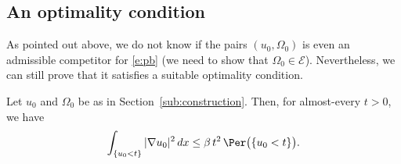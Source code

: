 \subsection{An optimality condition}
As pointed out above, we do not know if the pairs $(u_0,\Omega_0)$ is even an admissible competitor for \eqref{e:pb} (we need to show that $\Omega_0\in \mathcal E$). Nevertheless, we can still prove that it satisfies a suitable optimality condition.
\begin{lemma}\label{l:opt_cond}
Let $u_0$ and $\Omega_0$ be as in Section~\ref{sub:construction}. Then, for almost-every $t>0$, we have
\begin{equation}\label{e:opt_cond}
\int_{\{u_0<t\}}|\nabla u_0|^2\,dx\le \beta\, t^2\, \Per\big(\{u_0<t\}\big).
\end{equation}
\end{lemma}
